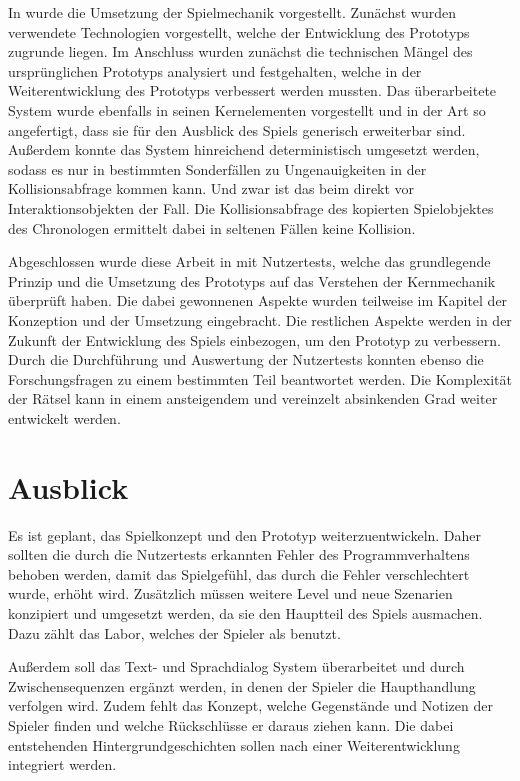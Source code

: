 In  wurde die Umsetzung der Spielmechanik vorgestellt. Zunächst wurden verwendete Technologien vorgestellt, welche der Entwicklung des Prototyps zugrunde liegen. Im Anschluss wurden zunächst die technischen Mängel des ursprünglichen Prototyps analysiert und festgehalten, welche in der Weiterentwicklung des Prototyps verbessert werden mussten. Das überarbeitete System wurde ebenfalls in seinen Kernelementen vorgestellt und in der Art so angefertigt, dass sie für den Ausblick des Spiels generisch erweiterbar sind.
Außerdem konnte das System hinreichend deterministisch umgesetzt werden, sodass es nur in bestimmten Sonderfällen zu Ungenauigkeiten in der Kollisionsabfrage kommen kann. Und zwar ist das beim  direkt vor Interaktionsobjekten der Fall. Die Kollisionsabfrage des kopierten Spielobjektes des Chronologen ermittelt dabei in seltenen Fällen keine Kollision.

Abgeschlossen wurde diese Arbeit in  mit Nutzertests, welche das grundlegende Prinzip und die Umsetzung des Prototyps auf das Verstehen der Kernmechanik überprüft haben. Die dabei gewonnenen Aspekte wurden teilweise im Kapitel der Konzeption und der Umsetzung eingebracht. Die restlichen Aspekte werden in der Zukunft der Entwicklung des Spiels einbezogen, um den Prototyp zu verbessern. Durch die Durchführung und Auswertung der Nutzertests konnten ebenso die Forschungsfragen zu einem bestimmten Teil beantwortet werden. Die Komplexität der Rätsel kann in einem ansteigendem und vereinzelt absinkenden Grad weiter entwickelt werden.

\section{Ausblick}\label{sec:ausblick}
Es ist geplant, das Spielkonzept und den Prototyp weiterzuentwickeln. Daher sollten die durch die Nutzertests erkannten Fehler des Programmverhaltens behoben werden, damit das Spielgefühl, das durch die Fehler verschlechtert wurde, erhöht wird.
Zusätzlich müssen weitere Level und neue Szenarien konzipiert und umgesetzt werden, da sie den Hauptteil des Spiels ausmachen. Dazu zählt das Labor, welches der Spieler als  benutzt.

Außerdem soll das Text- und Sprachdialog System überarbeitet und durch Zwischensequenzen ergänzt werden, in denen der Spieler die Haupthandlung verfolgen wird. Zudem fehlt das Konzept, welche Gegenstände und Notizen der Spieler finden und welche Rückschlüsse er daraus ziehen kann. Die dabei entstehenden Hintergrundgeschichten sollen nach einer Weiterentwicklung integriert werden.

